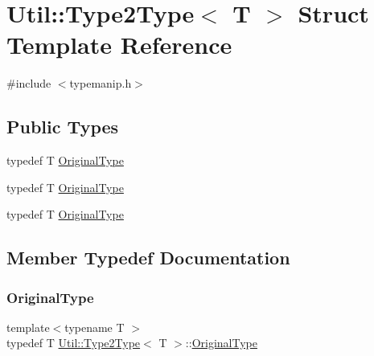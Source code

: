 \hypertarget{structUtil_1_1Type2Type}{}\section{Util\+:\+:Type2\+Type$<$ T $>$ Struct Template Reference}
\label{structUtil_1_1Type2Type}


{\ttfamily \#include $<$typemanip.\+h$>$}

\subsection*{Public Types}
\begin{DoxyCompactItemize}
\item 
typedef T \mbox{\hyperlink{structUtil_1_1Type2Type_a053c4160c945f1588beb737bb6e952d1}{Original\+Type}}
\item 
typedef T \mbox{\hyperlink{structUtil_1_1Type2Type_a053c4160c945f1588beb737bb6e952d1}{Original\+Type}}
\item 
typedef T \mbox{\hyperlink{structUtil_1_1Type2Type_a053c4160c945f1588beb737bb6e952d1}{Original\+Type}}
\end{DoxyCompactItemize}


\subsection{Member Typedef Documentation}
\mbox{\label{structUtil_1_1Type2Type_a053c4160c945f1588beb737bb6e952d1}} 
\subsubsection{\texorpdfstring{OriginalType}{OriginalType}\hspace{0.1cm}{\footnotesize\ttfamily [1/3]}}
{\footnotesize\ttfamily template$<$typename T $>$ \\
typedef T \mbox{\hyperlink{structUtil_1_1Type2Type}{Util\+::\+Type2\+Type}}$<$ T $>$\+::\mbox{\hyperlink{structUtil_1_1Type2Type_a053c4160c945f1588beb737bb6e952d1}{Original\+Type}}}

\mbox{\label{structUtil_1_1Type2Type_a053c4160c945f1588beb737bb6e952d1}} 
